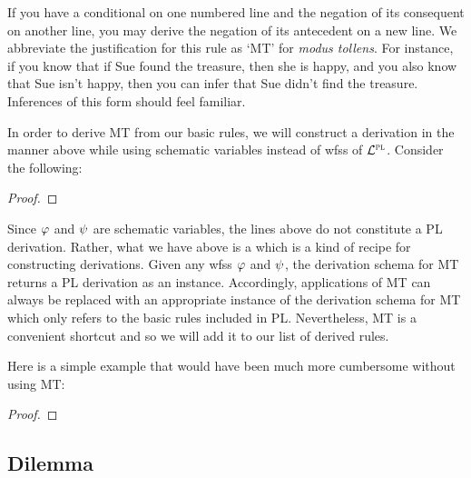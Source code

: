 If you have a conditional on one numbered line and the negation of its consequent on another line, you may derive the negation of its antecedent on a new line.
We abbreviate the justification for this rule as `MT' for \emph{modus tollens}.
For instance, if you know that if Sue found the treasure, then she is happy, and you also know that Sue isn't happy, then you can infer that Sue didn't find the treasure.
Inferences of this form should feel familiar.

In order to derive MT from our basic rules, we will construct a derivation in the manner above while using schematic variables instead of wfss of $\mathcal{L}^{\textsc{pl}}$.
Consider the following:

\begin{proof}
	 \want{\enot \metaB{}}
	\open
		 
	\close
\end{proof}

Since $\varphi$ and $\psi$ are schematic variables, the lines above do not constitute a PL derivation.
Rather, what we have above is a  which is a kind of recipe for constructing derivations.
Given any wfss $\varphi$ and $\psi$, the derivation schema for MT returns a PL derivation as an instance.
Accordingly, applications of MT can always be replaced with an appropriate instance of the derivation schema for MT which only refers to the basic rules included in PL.
Nevertheless, MT is a convenient shortcut and so we will add it to our list of derived rules.

Here is a simple example that would have been much more cumbersome without using MT:

\begin{proof}
	 
	 
	 
	 
\end{proof}



\subsection{Dilemma}

